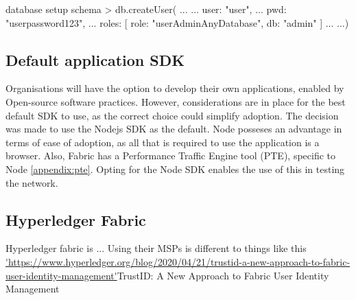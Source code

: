 

database setup schema 
> db.createUser(
... {
...   user: "user",
...   pwd: "userpassword123",
...   roles: [ { role: "userAdminAnyDatabase", db: "admin" } ]
... }
...)

\subsection{Default application SDK}

Organisations will have the option to develop their own applications, enabled by Open-source software practices. 
However, considerations are in place for the best default SDK to use, as the correct choice could simplify adoption.
The decision was made to use the Nodejs SDK as the default. 
Node posseses an advantage in terms of ease of adoption, as all that is required to use the application is a browser. 
Also, Fabric has a Performance Traffic Engine tool (PTE), specific to Node \ref{appendix:pte}. 
Opting for the Node SDK enables the use of this in testing the network.  


\subsection{Hyperledger Fabric}
Hyperledger fabric is ... Using their MSPs is different to things like this \url{'https://www.hyperledger.org/blog/2020/04/21/trustid-a-new-approach-to-fabric-user-identity-management'}{TrustID: A New Approach to Fabric User Identity Management} %

